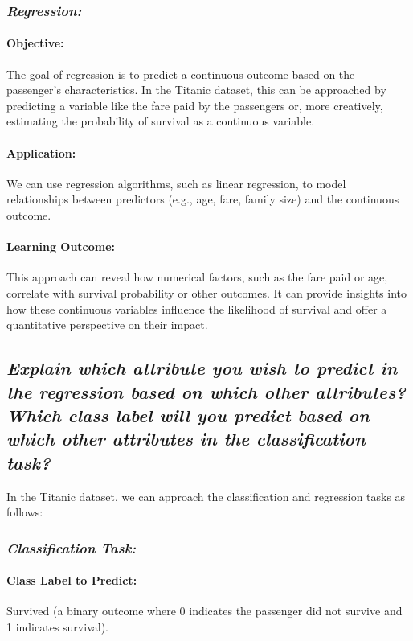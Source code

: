 \documentclass[twoside,11pt]{article}
\makeatletter
\let\@oldsubsection\subsection
\renewcommand\subsection[1]{\@oldsubsection*{\textit{#1}}}
\let\@oldsubsubsection\subsubsection
\renewcommand\subsubsection[1]{\@oldsubsubsection*{\textit{#1}}}
\makeatother
\begin{document}
\subsubsection{Regression:}

\paragraph{Objective:} The goal of regression is to predict a continuous outcome based on the passenger's characteristics. In the Titanic dataset, this can be approached by predicting a variable like the fare paid by the passengers or, more creatively, estimating the probability of survival as a continuous variable.

\paragraph{Application:} We can use regression algorithms, such as linear regression, to model relationships between predictors (e.g., age, fare, family size) and the continuous outcome.

\paragraph{Learning Outcome:} This approach can reveal how numerical factors, such as the fare paid or age, correlate with survival probability or other outcomes. It can provide insights into how these continuous variables influence the likelihood of survival and offer a quantitative perspective on their impact.

\subsection{Explain which attribute you wish to predict in the regression based on which other attributes? Which class label will you predict based on which other attributes in the classification task?}

In the Titanic dataset, we can approach the classification and regression tasks as follows:

\subsubsection{Classification Task:}

\paragraph{Class Label to Predict:} Survived (a binary outcome where 0 indicates the passenger did not survive and 1 indicates survival). \\
\end{document}
